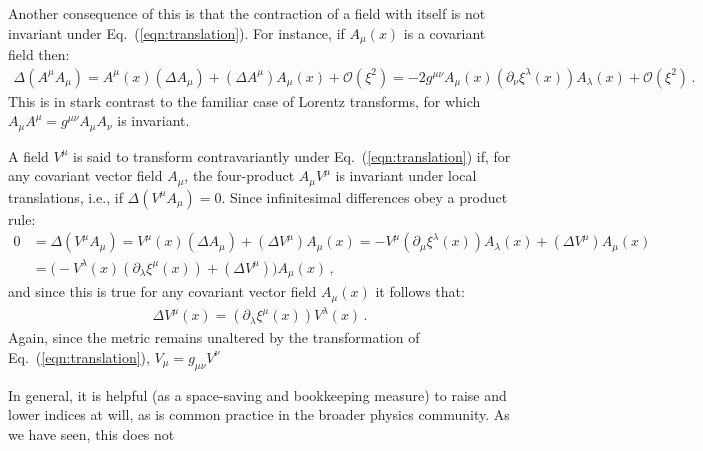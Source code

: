 \documentclass[prd,preprint,
  showpacs,showkeys,lengthcheck,
  nofootinbib,tightenlines,onecolumn,notitlepage,
  preprintnumbers,superscriptaddress]{revtex4-1}
\newcommand{\dx}{\ensuremath{\xi}}
\begin{document}
Another consequence of this is that the contraction of a field with itself
is not  invariant under Eq.~(\ref{eqn:translation}).
For instance, if $A_\mu(x)$ is a covariant field then:
\begin{align*}
  \Delta (A^\mu A_\mu)
  =
  A^\mu(x)
  (\Delta A_\mu)
  +
  (\Delta A^\mu) A_\mu(x)
  +
  \mathcal{O}(\dx^2)
  =
  - 2 g^{\mu\nu}
  A_\mu(x)
  (\partial_\nu \dx^\lambda(x))
  A_\lambda(x)
  +
  \mathcal{O}(\dx^2)
  \,.
\end{align*}
This is in stark contrast to the familiar case of Lorentz transforms,
for which $A_\mu A^\mu = g^{\mu\nu} A_\mu A_\nu$ is invariant.

A field $V^\mu$ is said to transform contravariantly
under Eq.~(\ref{eqn:translation}) if, for any covariant vector field $A_\mu$,
the four-product $A_\mu V^\mu$ is invariant under local translations,
i.e., if $\Delta( V^\mu A_\mu) = 0$.
Since infinitesimal differences obey a product rule:
\begin{align*}
  0
  &=
  \Delta(V^\mu A_\mu)
  =
  V^\mu(x) (\Delta A_\mu)
  +
  (\Delta V^\mu) A_\mu(x)
  =
  -V^\mu (\partial_\mu \dx^\lambda(x)) A_\lambda(x)
  +
  (\Delta V^\mu) A_\mu(x)
  \\
  &=
  \Big(
  -V^\lambda(x) (\partial_\lambda \dx^\mu(x))
  +
  (\Delta V^\mu)
  \Big)
  A_\mu(x)
  \,,
\end{align*}
and since this is true for any covariant vector field $A_\mu(x)$ it follows that:
\begin{align}
  \Delta V^\mu(x)
  =
  (\partial_\lambda \dx^\mu(x)) V^\lambda(x)
  \,.
\end{align}
Again, since the metric remains unaltered by the transformation of
Eq.~(\ref{eqn:translation}), $V_\mu = g_{\mu\nu} V^\nu$

In general, it is helpful (as a space-saving and bookkeeping measure)
to raise and lower indices at will, as is common practice in the
broader physics community.
As we have seen, this does not
\end{document}
